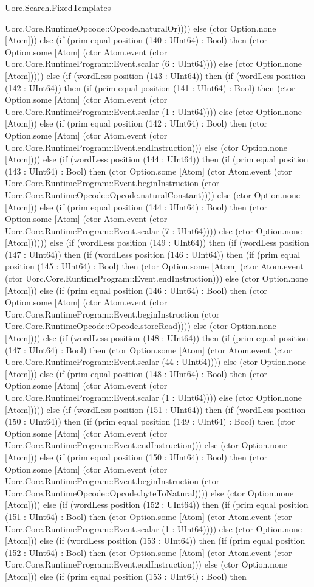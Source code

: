 \begin{lexlean}{Uorc.Search.FixedTemplates}
\begin{semanticmodule}
{Uorc.Core.RuntimeOpcode::Opcode.naturalOr)))) else (ctor Option.none [Atom])) else (if (prim equal position (140 : UInt64) : Bool) then (ctor Option.some [Atom] (ctor Atom.event (ctor Uorc.Core.RuntimeProgram::Event.scalar (6 : UInt64)))) else (ctor Option.none [Atom])))) else (if (wordLess position (143 : UInt64)) then (if (wordLess position (142 : UInt64)) then (if (prim equal position (141 : UInt64) : Bool) then (ctor Option.some [Atom] (ctor Atom.event (ctor Uorc.Core.RuntimeProgram::Event.scalar (1 : UInt64)))) else (ctor Option.none [Atom])) else (if (prim equal position (142 : UInt64) : Bool) then (ctor Option.some [Atom] (ctor Atom.event (ctor Uorc.Core.RuntimeProgram::Event.endInstruction))) else (ctor Option.none [Atom]))) else (if (wordLess position (144 : UInt64)) then (if (prim equal position (143 : UInt64) : Bool) then (ctor Option.some [Atom] (ctor Atom.event (ctor Uorc.Core.RuntimeProgram::Event.beginInstruction (ctor Uorc.Core.RuntimeOpcode::Opcode.naturalConstant)))) else (ctor Option.none [Atom])) else (if (prim equal position (144 : UInt64) : Bool) then (ctor Option.some [Atom] (ctor Atom.event (ctor Uorc.Core.RuntimeProgram::Event.scalar (7 : UInt64)))) else (ctor Option.none [Atom]))))) else (if (wordLess position (149 : UInt64)) then (if (wordLess position (147 : UInt64)) then (if (wordLess position (146 : UInt64)) then (if (prim equal position (145 : UInt64) : Bool) then (ctor Option.some [Atom] (ctor Atom.event (ctor Uorc.Core.RuntimeProgram::Event.endInstruction))) else (ctor Option.none [Atom])) else (if (prim equal position (146 : UInt64) : Bool) then (ctor Option.some [Atom] (ctor Atom.event (ctor Uorc.Core.RuntimeProgram::Event.beginInstruction (ctor Uorc.Core.RuntimeOpcode::Opcode.storeRead)))) else (ctor Option.none [Atom]))) else (if (wordLess position (148 : UInt64)) then (if (prim equal position (147 : UInt64) : Bool) then (ctor Option.some [Atom] (ctor Atom.event (ctor Uorc.Core.RuntimeProgram::Event.scalar (44 : UInt64)))) else (ctor Option.none [Atom])) else (if (prim equal position (148 : UInt64) : Bool) then (ctor Option.some [Atom] (ctor Atom.event (ctor Uorc.Core.RuntimeProgram::Event.scalar (1 : UInt64)))) else (ctor Option.none [Atom])))) else (if (wordLess position (151 : UInt64)) then (if (wordLess position (150 : UInt64)) then (if (prim equal position (149 : UInt64) : Bool) then (ctor Option.some [Atom] (ctor Atom.event (ctor Uorc.Core.RuntimeProgram::Event.endInstruction))) else (ctor Option.none [Atom])) else (if (prim equal position (150 : UInt64) : Bool) then (ctor Option.some [Atom] (ctor Atom.event (ctor Uorc.Core.RuntimeProgram::Event.beginInstruction (ctor Uorc.Core.RuntimeOpcode::Opcode.byteToNatural)))) else (ctor Option.none [Atom]))) else (if (wordLess position (152 : UInt64)) then (if (prim equal position (151 : UInt64) : Bool) then (ctor Option.some [Atom] (ctor Atom.event (ctor Uorc.Core.RuntimeProgram::Event.scalar (1 : UInt64)))) else (ctor Option.none [Atom])) else (if (wordLess position (153 : UInt64)) then (if (prim equal position (152 : UInt64) : Bool) then (ctor Option.some [Atom] (ctor Atom.event (ctor Uorc.Core.RuntimeProgram::Event.endInstruction))) else (ctor Option.none [Atom])) else (if (prim equal position (153 : UInt64) : Bool) then }
\end{semanticmodule}
\end{lexlean}
